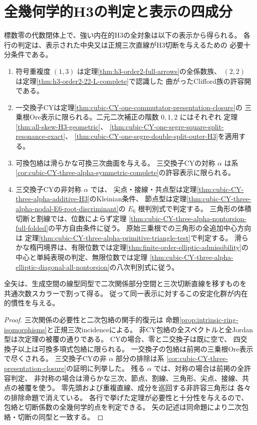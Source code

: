 \section{全幾何学的H3の判定と表示の四成分}
\label{sec:cubic-presentation-components}

\begin{theorem}\label{thm:h3-complete-geometric-admissibility}
標数零の代数閉体上で、強い内在的H3の全対象は以下の表示から得られる。
各行の判定は、表示された中央又は正規三次直線がH3切断を与えるための
必要十分条件である。
\begin{enumerate}
\item 符号重複度 $(1,3)$ は定理\ref{thm:h3-order2-full-arrows}の全係数族、
$(2,2)$ は定理\ref{thm:h3-order2-22-L-complete}で認識した
曲がったClifford族の許容開である。
\item 一交換子CYは定理\ref{thm:cubic-CY-one-commutator-presentation-closure}の
三乗根Ore表示に限られる。二元二次補正の階数 $0,1,2$ にはそれぞれ
定理\ref{thm:all-skew-H3-geometric}、
\ref{thm:cubic-CY-one-segre-square-split-resonance-exact}、
\ref{thm:cubic-CY-one-segre-double-split-outer-H3}を適用する。
\item 可換包絡は滑らかな可換三次曲面を与える。
三交換子CYの対称 $\alpha$ は系
\ref{cor:cubic-CY-three-alpha-symmetric-complete}の許容表示に限られる。
\item 三交換子CYの非対称 $\alpha$ では、
尖点・接線・共点型は定理\ref{thm:cubic-CY-three-alpha-additive-H3}のKleinian条件、
節点型は定理\ref{thm:cubic-CY-three-alpha-nodal-E6-root-discriminant}の
$E_6$ 根判別式で判定する。
三角形の体積切断と割線では、位数によらず定理
\ref{thm:cubic-CY-three-alpha-nontorsion-full-folded}の平方自由条件に従う。
原始三乗根での三角形の全追加中心方向は
定理\ref{thm:cubic-CY-three-alpha-primitive-triangle-test}で判定する。
滑らかな楕円境界は、有限位数では定理\ref{thm:finite-order-elliptic-admissibility}の
中心と単純表現の判定、無限位数では定理
\ref{thm:cubic-CY-three-alpha-elliptic-diagonal-all-nontorsion}の八次判別式に従う。
\end{enumerate}
全矢は、生成空間の線型同型で二次関係部分空間と三次切断直線を移すものを
共通次数スカラーで割って得る。
従って同一表示に対するこの安定化群が内在的慣性を与える。
\end{theorem}
\begin{proof}
三次関係の必要性と二次包絡の関手的復元は
命題\ref{prop:intrinsic-ring-isomorphisms}と正規三次incidenceによる。
非CY包絡の全スペクトルと全Jordan型は次定理の被覆の通りである。
CYの場合、零と二交換子は既に空で、
四交換子以上は可換多項式包絡に限られる。
一交換子の包絡は前掲の三乗根Ore表示で尽くされる。
三交換子CYの非 $\alpha$ 部分の排除は系
\ref{cor:cubic-CY-three-presentation-closure}の証明に列挙した。
残る $\alpha$ では、対称の場合は前掲の全許容判定、
非対称の場合は滑らかな三次、節点、割線、三角形、尖点、接線、共点の被覆を使う。
零先頭および重複直線、成分を巡回する非許容三角形は
各々の排除命題で消えている。
各行で挙げた定理が必要性と十分性を与えるので、
包絡と切断係数の全幾何学的点を判定できる。
矢の記述は同命題により二次包絡・切断の同型と一致する。
\end{proof}

